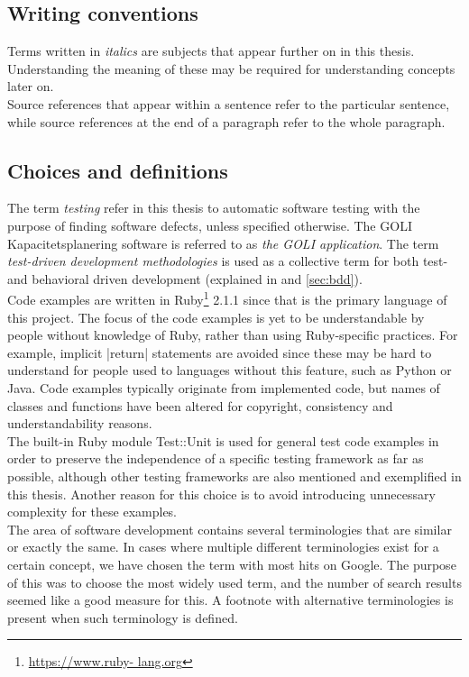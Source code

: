 \MakeShortVerb{\|}

\subsection{Writing conventions}

Terms written in \emph{italics} are subjects that appear further on in
this thesis. Understanding the meaning of these may be required for
understanding concepts later on.\\

Source references that appear within a sentence refer to the particular
sentence, while source references at the end of a paragraph refer to the
whole paragraph.\\


\subsection{Choices and definitions}

The term \emph{testing} refer in this thesis to automatic software
testing with the purpose of finding software defects, unless specified
otherwise. The GOLI Kapacitetsplanering software is referred to as
\emph{the GOLI application}. The term \emph{test-driven development
methodologies} is used as a collective term for both test- and
behavioral driven development (explained in  and
\ref{sec:bdd}).\\

Code examples are written in Ruby\footnote{\url{https://www.ruby-
lang.org}} 2.1.1 since that is the primary language of this project. The
focus of the code examples is yet to be understandable by people without
knowledge of Ruby, rather than using Ruby-specific practices. For
example, implicit |return| statements are avoided since these may be
hard to understand for people used to languages without this feature,
such as Python or Java. Code examples typically originate from
implemented code, but names of classes and functions have been altered
for copyright, consistency and understandability reasons.\\

The built-in Ruby module Test::Unit is used for general test code
examples in order to preserve the independence of a specific testing
framework as far as possible, although other testing frameworks are also
mentioned and exemplified in this thesis. Another reason for this choice
is to avoid introducing unnecessary complexity for these examples.\\

The area of software development contains several terminologies that are
similar or exactly the same. In cases where multiple different
terminologies exist for a certain concept, we have chosen the term with
most hits on Google. The purpose of this was to choose the most widely
used term, and the number of search results seemed like a good measure
for this. A footnote with alternative terminologies is present when
such terminology is defined.\\
